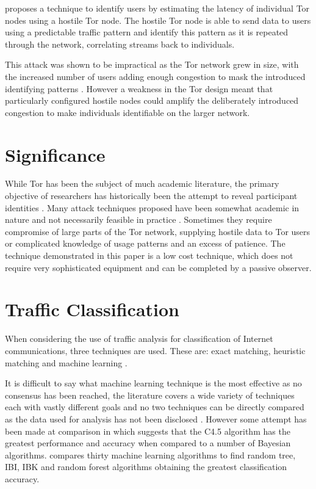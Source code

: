 \documentclass[conference]{IEEEtran}
\begin{document}
\textcite{Murdoch:2005p325} proposes a technique to identify users by estimating
the latency of individual Tor nodes using a hostile Tor node. The hostile Tor
node is able to send data to users using a predictable traffic pattern and
identify this pattern as it is repeated through the network, correlating streams
back to individuals.

This attack was shown to be impractical as the Tor network grew in size, with
the increased number of users adding enough congestion to mask the introduced
identifying patterns \parencite{Evans:2009p315}. However a weakness in the Tor
design meant that particularly configured hostile nodes could amplify the
deliberately introduced congestion to make individuals identifiable on the
larger network.

\section{Significance}

While Tor has been the subject of much academic literature, the primary
objective of researchers has historically been the attempt to reveal participant
identities \parencite[3]{Murdoch:2005p325}.  Many attack techniques proposed
have been somewhat academic in nature and not necessarily feasible in practice
\parencite{Raccoon:2008fk}. Sometimes they require compromise of large parts of
the Tor network, supplying hostile data to Tor users or complicated knowledge of
usage patterns and an excess of patience. The technique demonstrated in this
paper is a low cost technique, which does not require very sophisticated
equipment and can be completed by a passive observer.

\section{Traffic Classification}

When considering the use of traffic analysis for classification of Internet
communications, three techniques are used. These are: exact matching, heuristic
matching and machine learning \parencite{Zhang:2009p1188}.

It is difficult to say what machine learning technique is the most effective as
no consensus has been reached, the literature covers a wide variety of
techniques each with vastly different goals and no two techniques can be
directly compared as the data used for analysis has not been disclosed
\parencite{Kim:2007p3867}. However some attempt has been made at comparison in
\textcite{Williams:2006p3849} which suggests that the C4.5 algorithm has the
greatest performance and accuracy when compared to a number of Bayesian
algorithms. \textcite{Mohd:2009p6484} compares thirty machine learning
algorithms to find random tree, IBI, IBK and random forest algorithms
obtaining the greatest classification accuracy.
\end{document}
